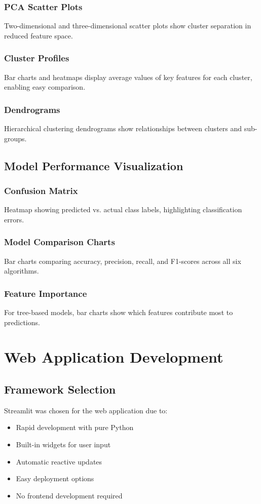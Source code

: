 \documentclass[12pt,a4paper]{report}
\begin{document}
\subsubsection{PCA Scatter Plots}
Two-dimensional and three-dimensional scatter plots show cluster separation in reduced feature space.

\subsubsection{Cluster Profiles}
Bar charts and heatmaps display average values of key features for each cluster, enabling easy comparison.

\subsubsection{Dendrograms}
Hierarchical clustering dendrograms show relationships between clusters and sub-groups.


\subsection{Model Performance Visualization}
\subsubsection{Confusion Matrix}
Heatmap showing predicted vs. actual class labels, highlighting classification errors.

\subsubsection{Model Comparison Charts}
Bar charts comparing accuracy, precision, recall, and F1-scores across all six algorithms.

\subsubsection{Feature Importance}
For tree-based models, bar charts show which features contribute most to predictions.

\section{Web Application Development}

\subsection{Framework Selection}
\noindent Streamlit was chosen for the web application due to:
\begin{itemize}
    \item Rapid development with pure Python
    \item Built-in widgets for user input
    \item Automatic reactive updates
    \item Easy deployment options
    \item No frontend development required
\end{itemize}
\end{document}
